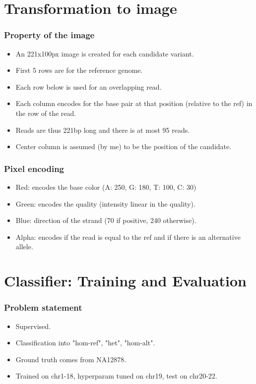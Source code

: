 \documentclass{beamer}
\begin{document}
\section{Transformation to image}

\begin{frame}
    \frametitle{Property of the image}

    \begin{itemize}
        \item An 221x100px image is created for each candidate variant.
        \item First 5 rows are for the reference genome.
        \item Each row below is used for an overlapping read.
        \item Each column encodes for the base pair at that position (relative to the ref) in the
            row of the read.
        \item Reads are thus 221bp long and there is at most 95 reads.
        \item Center column is assumed (by me) to be the position of the candidate.
    \end{itemize}

\end{frame}

\begin{frame}
    \frametitle{Pixel encoding}

    \begin{itemize}
        \item Red: encodes the base color (A: 250, G: 180, T: 100, C: 30)
        \item Green: encodes the quality (intensity linear in the quality). 
        \item Blue: direction of the strand (70 if positive, 240 otherwise).
        \item Alpha: encodes if the read is equal to the ref and if there is an alternative allele.
    \end{itemize}

\end{frame}

\section{Classifier: Training and Evaluation}

\begin{frame}
    \frametitle{Problem statement}

    \begin{itemize}
        \item Supervised.
        \item Classification into "hom-ref", "het", "hom-alt".
        \item Ground truth comes from NA12878.
        \item Trained on chr1-18, hyperparam tuned on chr19, test on chr20-22.
    \end{itemize}
\end{frame}
\end{document}

